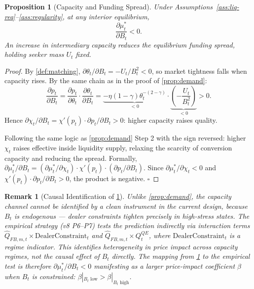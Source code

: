 \documentclass[12pt]{article}
\newtheorem{proposition}{Proposition}
\newtheorem{remark}{Remark}
\theoremstyle{definition}
\newcommand{\1}[1]{\mathds{1}\left[#1\right]}
\begin{document}
\begin{proposition}[Capacity and Funding Spread]
  \label{prop:capacity}
  Under Assumptions~\ref{ass:liq-req}--\ref{ass:regularity}, at any interior
  equilibrium,
  \[
    \frac{\partial \mu_t^*}{\partial B_t} < 0.
  \]
  An increase in intermediary capacity reduces the equilibrium funding spread,
  holding seeker mass $U_t$ fixed.
\end{proposition}

\begin{proof}
  By \cref{def:matching}, $\partial\theta_t/\partial B_t = -U_t/B_t^2 < 0$, so
  market tightness falls when capacity rises. By the same chain as in the proof
  of \cref{prop:demand}:
  \[
    \frac{\partial p_t}{\partial B_t} =
    \frac{\partial p_t}{\partial\theta_t}\cdot\frac{\partial\theta_t}{\partial B_t}
    = \underbrace{-\eta(1-\gamma)\theta_t^{-(2-\gamma)}}_{<0}
      \cdot\underbrace{\left(-\frac{U_t}{B_t^2}\right)}_{<0} > 0.
  \]
  Hence $\partial\chi_t/\partial B_t = \chi'(p_t)\cdot\partial p_t/\partial
  B_t > 0$: higher capacity raises quality.

  Following the same logic as \cref{prop:demand} Step 2 with the sign reversed:
  higher $\chi_t$ raises effective inside liquidity supply, relaxing the
  scarcity of conversion capacity and reducing the spread. Formally,
  $\partial\mu_t^*/\partial B_t = (\partial\mu_t^*/\partial\chi_t)\cdot
  \chi'(p_t)\cdot(\partial p_t/\partial B_t)$. Since $\partial\mu_t^*/
  \partial\chi_t < 0$ and $\chi'(p_t)\cdot\partial p_t/\partial B_t > 0$,
  the product is negative.
  \hfill$\square$
\end{proof}

\begin{remark}[Causal Identification of \cref{prop:capacity}]
  Unlike \cref{prop:demand}, the capacity channel cannot be identified by a
  clean instrument in the current design, because $B_t$ is endogenous ---
  dealer constraints tighten precisely in high-stress states. The empirical
  strategy (v8 P6--P7) tests the prediction indirectly via interaction terms
  $\hat{Q}_{FB,m,t} \times \mathrm{DealerConstraint}_t$ and $\hat{Q}_{FB,m,t}
  \times Q_t^{QE}$, where $\mathrm{DealerConstraint}_t$ is a regime indicator.
  This identifies heterogeneity in price impact across capacity regimes, not
  the causal effect of $B_t$ directly. The mapping from \cref{prop:capacity} to
  the empirical test is therefore $\partial\mu_t^*/\partial B_t < 0$ manifesting
  as a larger price-impact coefficient $\beta$ when $B_t$ is constrained:
  $\beta|_{B_t\text{ low}} > \beta|_{B_t\text{ high}}$.
\end{remark}
\end{document}
